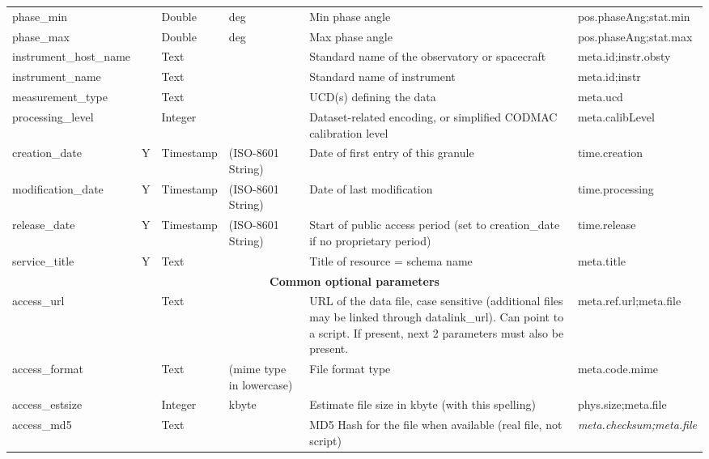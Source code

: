 \documentclass[11pt,a4paper]{ivoa}
\begin{document}
\begin{longtable}{p{3.5cm}p{0.5cm}p{1cm}p{1cm}p{7cm}p{3cm}}
phase\_min&&Double&deg&Min phase angle&pos.phaseAng;stat.min\\

phase\_max&&Double&deg&Max phase angle&pos.phaseAng;stat.max\\

instrument\_host\_name&&Text&&Standard name of the observatory or spacecraft&meta.id;instr.obsty\\

instrument\_name&&Text&&Standard name of instrument&meta.id;instr\\

measurement\_type&&Text&&UCD(s) defining the data&meta.ucd\\

processing\_level&&Integer&&Dataset-related encoding, or simplified CODMAC calibration level&meta.calibLevel\\

creation\_date&Y&Timestamp&(ISO-8601 String)&Date of first entry of this granule&time.creation\\

modification\_date&Y&Timestamp&(ISO-8601 String)&Date of last modification&time.processing\\

release\_date&Y&Timestamp&(ISO-8601 String)&Start of public access period (set to creation\_date if no proprietary period)&time.release\\

service\_title&Y&Text&&Title of resource = schema name&meta.title\\

\multicolumn{6}{c}{\vrule width 0pt height 20pt depth 12pt \textbf{\textbf{Common optional parameters}}}\\

access\_url&&Text&&URL of the data file, case sensitive (additional files may be linked through datalink\_url). Can point to a script. If present, next 2 parameters must also be present.&meta.ref.url;meta.file\\

access\_format&&Text&(mime type in lowercase)&File format type&meta.code.mime\\

access\_estsize&&Integer&kbyte&Estimate file size in kbyte (with this spelling)&phys.size;meta.file\\

access\_md5&&Text&&MD5 Hash for the file when available (real file, not script)&\emph{ meta.checksum;meta.file}\\


\end{longtable}
\end{document}
